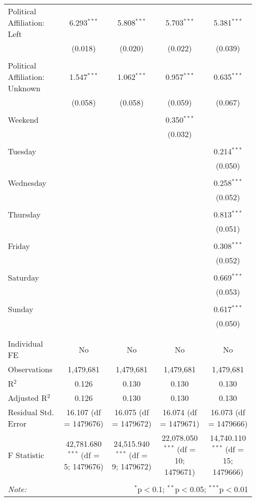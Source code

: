 \documentclass[
]{article}
\begin{document}
\begin{table}[!htbp]
{\begin{tabular}{@{\extracolsep{5pt}}lcccc}
 Political Affiliation: Left & 6.293$^{***}$ & 5.808$^{***}$ & 5.703$^{***}$ & 5.381$^{***}$ \\ 
  & (0.018) & (0.020) & (0.022) & (0.039) \\ 
  & & & & \\ 
 Political Affiliation: Unknown & 1.547$^{***}$ & 1.062$^{***}$ & 0.957$^{***}$ & 0.635$^{***}$ \\ 
  & (0.058) & (0.058) & (0.059) & (0.067) \\ 
  & & & & \\ 
 Weekend &  &  & 0.350$^{***}$ &  \\ 
  &  &  & (0.032) &  \\ 
  & & & & \\ 
 Tuesday &  &  &  & 0.214$^{***}$ \\ 
  &  &  &  & (0.050) \\ 
  & & & & \\ 
 Wednesday &  &  &  & 0.258$^{***}$ \\ 
  &  &  &  & (0.052) \\ 
  & & & & \\ 
 Thursday &  &  &  & 0.813$^{***}$ \\ 
  &  &  &  & (0.051) \\ 
  & & & & \\ 
 Friday &  &  &  & 0.308$^{***}$ \\ 
  &  &  &  & (0.052) \\ 
  & & & & \\ 
 Saturday &  &  &  & 0.669$^{***}$ \\ 
  &  &  &  & (0.053) \\ 
  & & & & \\ 
 Sunday &  &  &  & 0.617$^{***}$ \\ 
  &  &  &  & (0.050) \\ 
  & & & & \\ 
\hline \\[-1.8ex] 
Individual FE & No & No & No & No \\ 
Observations & 1,479,681 & 1,479,681 & 1,479,681 & 1,479,681 \\ 
R$^{2}$ & 0.126 & 0.130 & 0.130 & 0.130 \\ 
Adjusted R$^{2}$ & 0.126 & 0.130 & 0.130 & 0.130 \\ 
Residual Std. Error & 16.107 (df = 1479676) & 16.075 (df = 1479672) & 16.074 (df = 1479671) & 16.073 (df = 1479666) \\ 
F Statistic & 42,781.680$^{***}$ (df = 5; 1479676) & 24,515.940$^{***}$ (df = 9; 1479672) & 22,078.050$^{***}$ (df = 10; 1479671) & 14,740.110$^{***}$ (df = 15; 1479666) \\ 
\hline 
\hline \\[-1.8ex] 
\textit{Note:}  & \multicolumn{4}{r}{$^{*}$p$<$0.1; $^{**}$p$<$0.05; $^{***}$p$<$0.01} \\ 
\end{tabular}
} 
\end{table} 
\newpage
\end{document}
